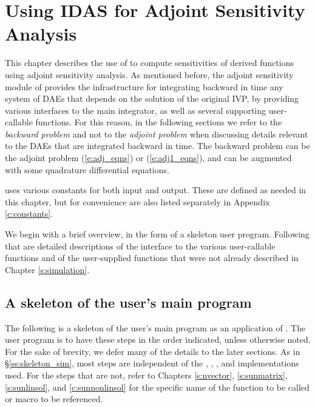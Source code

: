 \chapter{Using IDAS for Adjoint Sensitivity Analysis}\label{s:adjoint}

This chapter describes the use of {\idas} to compute sensitivities of derived
functions using adjoint sensitivity analysis. As mentioned before, the adjoint
sensitivity module of {\idas} provides the infrastructure for integrating
backward in time any system of DAEs that depends on the solution of the original
IVP, by providing various interfaces to the main {\idas} integrator, as well
as several supporting user-callable functions. For this reason, in the following
sections we refer to the {\em backward problem} and not to the
{\em adjoint problem} when discussing details relevant to the DAEs that
are integrated backward in  time. The backward problem can be the adjoint problem
(\ref{e:adj_eqns}) or (\ref{e:adj1_eqns}), and
can be augmented with some quadrature differential equations.

{\idas} uses various constants for both input and output.  These are
defined as needed in this chapter, but for convenience are also listed
separately in Appendix \ref{c:constants}.

We begin with a brief overview, in the form of a skeleton user program.
Following that are detailed descriptions of the interface to the
various user-callable functions and of the user-supplied functions that were
not already described in Chapter \ref{s:simulation}.

\section{A skeleton of the user's main program}\label{ss:skeleton_adj}
The following is a skeleton of the user's main program as an application of
{\idas}. The user program is to have these steps in the order indicated,
unless otherwise noted. For the sake of brevity, we defer many of the details
to the later sections.
As in \S\ref{ss:skeleton_sim}, most steps are independent of
the {\nvector}, {\sunmatrix}, {\sunlinsol}, and {\sunnonlinsol}
implementations used. For the steps that are not, refer to Chapters
\ref{s:nvector}, \ref{s:sunmatrix}, \ref{s:sunlinsol}, and \ref{c:sunnonlinsol}
for the specific name of the function to be called or macro to be referenced.

